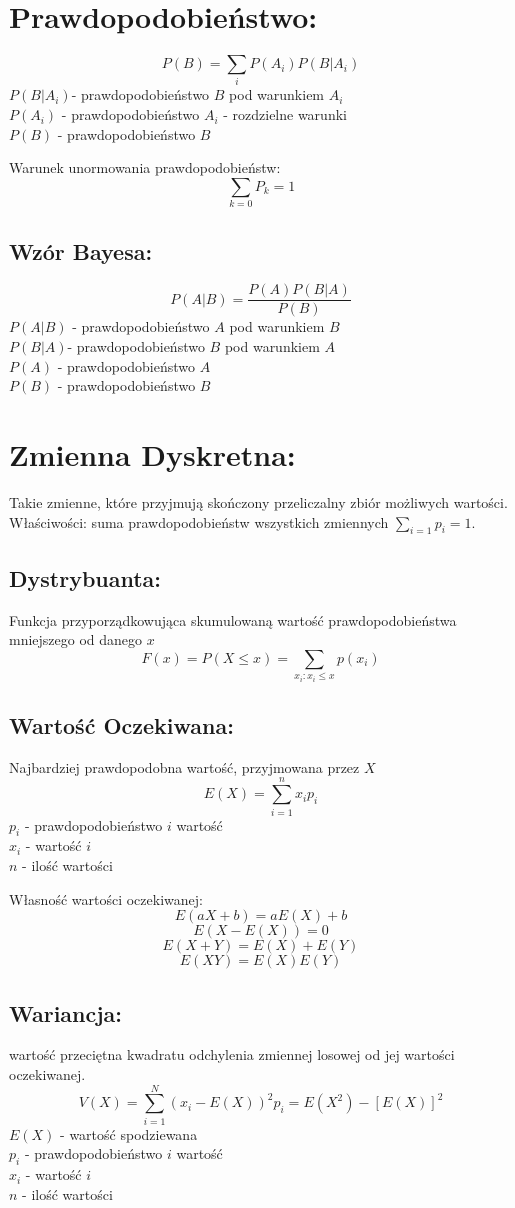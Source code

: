 \documentclass[fleqn]{article}
\begin{document}
\pagebreak
\section{Prawdopodobieństwo:}
\[P(B) = \sum_i{P(A_i)P(B|A_i)}\]
$P(B|A_i)$- prawdopodobieństwo $B$ pod warunkiem $A_i$\\
$P(A_i)$ - prawdopodobieństwo $A_i$ - rozdzielne warunki\\
$P(B)$ - prawdopodobieństwo $B$

Warunek unormowania prawdopodobieństw:
\[\sum_{k=0}{P_k}=1\]

\subsection{Wzór Bayesa:}
\[P(A|B) = \frac{P(A)P(B|A)}{P(B)}\]
$P(A|B)$ - prawdopodobieństwo $A$ pod warunkiem $B$\\
$P(B|A)$- prawdopodobieństwo $B$ pod warunkiem $A$\\
$P(A)$ - prawdopodobieństwo $A$\\
$P(B)$ - prawdopodobieństwo $B$

\pagebreak

\section{Zmienna Dyskretna:}
Takie zmienne, które przyjmują skończony przeliczalny zbiór możliwych wartości.
Właściwości: suma prawdopodobieństw wszystkich zmiennych \(\sum_{i=1}{p_i}=1\).
\subsection{Dystrybuanta:}
Funkcja przyporządkowująca skumulowaną wartość prawdopodobieństwa mniejszego od danego $x$
\[F(x)=P(X \leq x)=\sum_{x_i:x_i \leq x}p(x_i)\]
\subsection{Wartość Oczekiwana:}
Najbardziej prawdopodobna wartość, przyjmowana przez $X$
\[E(X) = \sum_{i=1}^nx_ip_i\]
$p_i$ - prawdopodobieństwo $i$ wartość\\
$x_i$ - wartość $i$\\
$n$   - ilość wartości

Własność wartości oczekiwanej:
\[E(aX+b)=aE(X)+b\]
\[E(X-E(X))=0\]
\[E(X+Y)=E(X)+E(Y)\]
\[E(XY)=E(X)E(Y)\]

\subsection{Wariancja:}
wartość przeciętna kwadratu odchylenia zmiennej losowej od jej wartości oczekiwanej.
\[V(X) = \sum_{i=1}^N(x_i-E(X))^2p_i = E(X^2) - [E(X)]^2\]
$E(X)$ - wartość spodziewana\\
$p_i$ - prawdopodobieństwo $i$ wartość\\
$x_i$ - wartość $i$\\
$n$   - ilość wartości
\end{document}
